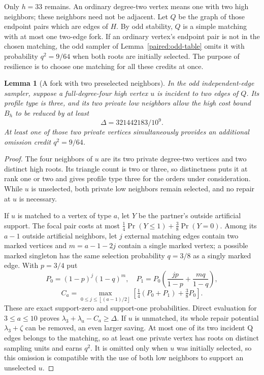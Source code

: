 \documentclass[11pt,a4paper]{article}
\newtheorem{lemma}[theorem]{Lemma}
\theoremstyle{definition}\newtheorem{definition}[theorem]{Definition}
\theoremstyle{remark}\newtheorem{remark}[theorem]{Remark}
\newcommand{\floor}[1]{\left\lfloor#1\right\rfloor}
\begin{document}
Only $h=33$ remains. An ordinary degree-two vertex means one with
two high neighbors; these neighbors need not be adjacent. Let $Q$
be the graph of those endpoint pairs which are edges of $H$.
By odd stability, $Q$ is a simple matching with at most one two-edge
fork. If an ordinary vertex's endpoint pair is not in the chosen
matching, the odd sampler of Lemma~\ref{paired:odd-table} omits it
with probability $q^2=9/64$ when both roots are initially selected.
The purpose of resilience is to choose one matching for all these
credits at once.

\begin{lemma}[A fork with two preselected neighbors]
\label{paired:prepaid-fork}
In the odd independent-edge sampler, suppose a full-degree-four high
vertex $u$ is incident to two edges of $Q$. Its profile type is three,
and its two private low neighbors allow the high cost bound $B_h$
to be reduced by at least
\[
 \Delta=321442183/10^9.
\]
At least one of those two private vertices simultaneously provides
an additional omission credit $q^2=9/64$.
\end{lemma}
\begin{proof}
The four neighbors of $u$ are its two private degree-two vertices
and two distinct high roots. Its triangle count is two or three,
so distinctness puts it at rank one or two and gives profile type
three for the orders under consideration. While $u$ is unselected,
both private low neighbors remain selected, and no repair at $u$
is necessary.

If $u$ is matched to a vertex of type $a$, let $Y$ be the partner's
outside artificial support. The focal pair costs at most
$\tfrac14\Pr(Y\le1)+\tfrac38\Pr(Y=0)$. Among its $a-1$ outside
artificial neighbors, let $j$ external matching edges contain two
marked vertices and $m=a-1-2j$ contain a single marked vertex;
a possible marked singleton has the same selection probability
$q=3/8$ as a singly marked edge. With $p=3/4$ put
\[
 P_0=(1-p)^j(1-q)^m,
 \quad P_1=P_0\left(\frac{jp}{1-p}+\frac{mq}{1-q}\right),
\]
\[
 C_a=\max_{0\le j\le\floor{(a-1)/2}}
       \left[\tfrac14(P_0+P_1)+\tfrac38P_0\right].
\]
These are exact support-zero and support-one probabilities. Direct
evaluation for $3\le a\le10$ proves
$\lambda_3+\lambda_a-C_a\ge\Delta$. If $u$ is unmatched, its
whole repair potential $\lambda_3+\zeta$ can be removed, an even
larger saving. At most one of its two incident Q edges belongs
to the matching, so at least one private vertex has roots on distinct
sampling units and earns $q^2$. It is omitted only when $u$ was
initially selected, so this omission is compatible with the use of
both low neighbors to support an unselected $u$.
\end{proof}
\end{document}
